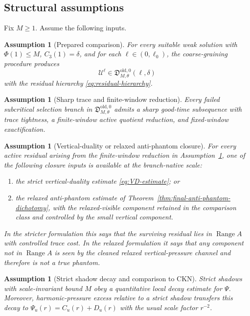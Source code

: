 \documentclass[11pt]{article}
\numberwithin{equation}{section}
\newtheorem{assumption}[theorem]{Assumption}
\DeclareMathOperator{\Range}{Range}
\newcommand{\old}{\mathrm{old}}
\newcommand{\calU}{\mathcal U}
\newcommand{\frakD}{\mathfrak D}
\begin{document}
\subsection{Structural assumptions}

Fix \(M\ge1\).  Assume the following inputs.

\begin{assumption}[Prepared comparison]\label{ass:prepared-comparison}
For every suitable weak solution with \(\Phi(1)\le M\), \(C_3(1)=\delta\), and for each \(\ell\in(0,\ell_0)\), the coarse-graining procedure produces
\[
\calU^\ell\in\frakD^{\old,0}_{M,\theta}(\ell,
\delta)
\]
with the residual hierarchy \eqref{eq:residual-hierarchy}.
\end{assumption}

\begin{assumption}[Sharp trace and finite-window reduction]\label{ass:trace-reduction}
Every failed subcritical selection branch in \(\frakD^{\old,0}_{M,\theta}\) admits a sharp good-time subsequence with trace tightness, a finite-window active quotient reduction, and fixed-window exactification.
\end{assumption}

\begin{assumption}[Vertical-duality or relaxed anti-phantom closure]\label{ass:VD-closure}
For every active residual arising from the finite-window reduction in Assumption~\ref{ass:trace-reduction}, one of the following closure inputs is available at the branch-native scale:
\begin{enumerate}[label=(\roman*)]
\item the strict vertical-duality estimate \eqref{eq:VD-estimate}; or
\item the relaxed anti-phantom estimate of Theorem~\ref{thm:final-anti-phantom-dichotomy}, with the relaxed-visible component retained in the comparison class and controlled by the small vertical component.
\end{enumerate}
In the stricter formulation this says that the surviving residual lies in \(\Range A\) with controlled trace cost.  In the relaxed formulation it says that any component not in \(\Range A\) is seen by the cleaned relaxed vertical-pressure channel and therefore is not a true phantom.
\end{assumption}

\begin{assumption}[Strict shadow decay and comparison to CKN]\label{ass:strict-decay-CKN}
Strict shadows with scale-invariant bound \(M\) obey a quantitative local decay estimate for \(\Psi\).  Moreover, harmonic-pressure excess relative to a strict shadow transfers this decay to \(\Psi_u(r)=C_u(r)+D_u(r)\) with the usual scale factor \(r^{-2}\).
\end{assumption}
\end{document}
